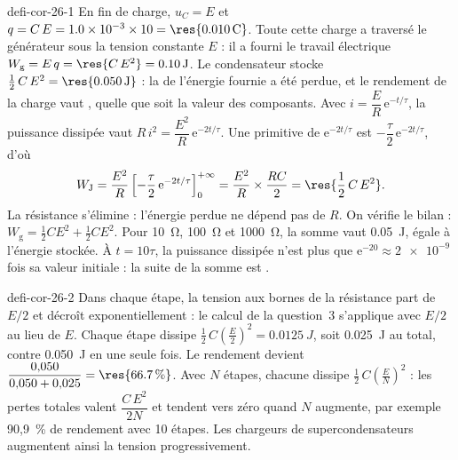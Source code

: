 \begin{blocEdition}{defi-cor-26-1}
En fin de charge, $u_C=E$ et $q=C\,E=\num{1.0e-3}\times10=\res{\qty{0,010}{C}}$. Toute cette charge a traversé le générateur sous la
tension constante $E$ : il a fourni le travail électrique $W_\mathrm{g}=E\,q=\res{C\,E^2}=\qty{0,10}{J}$.
Le condensateur stocke $\frac12\,C\,E^2=\res{\qty{0,050}{J}}$ : la  de l'énergie fournie a été perdue, et le rendement
de la charge vaut , quelle que soit la valeur des composants.
Avec $i=\dfrac{E}{R}\,\mathrm{e}^{-t/\tau}$, la puissance dissipée vaut $R\,i^2=\dfrac{E^2}{R}\,\mathrm{e}^{-2t/\tau}$. Une primitive de $\mathrm{e}^{-2t/\tau}$ est
$-\dfrac{\tau}{2}\,\mathrm{e}^{-2t/\tau}$, d'où
\[W_\mathrm{J}=\frac{E^2}{R}\left[-\frac{\tau}{2}\,\mathrm{e}^{-2t/\tau}\right]_0^{+\infty}=\frac{E^2}{R}\times\frac{RC}{2}=\res{\frac12\,C\,E^2}.\]
La résistance s'élimine : l'énergie perdue ne dépend pas de $R$. On vérifie le bilan : $W_\mathrm{g}=\frac12CE^2+\frac12CE^2$.
Pour \qty{10}{\ohm}, \qty{100}{\ohm} et \qty{1000}{\ohm}, la somme vaut \qty{0,05}{J}, égale à l'énergie stockée. À $t=10\tau$, la puissance
dissipée n'est plus que $\mathrm{e}^{-20}\approx\num{2e-9}$ fois sa valeur initiale : la suite de la somme est .
\end{blocEdition}

\begin{blocEdition}{defi-cor-26-2}
\label{figedition-defi-cor-26-2-1}
Dans chaque étape, la tension aux bornes de la résistance part de $E/2$ et décroît exponentiellement : le calcul de la
question~3 s'applique avec $E/2$ au lieu de $E$. Chaque étape dissipe $\frac12\,C\left(\frac{E}{2}\right)^2=\qty{0,0125}{J}$, soit
\qty{0,025}{J} au total, contre \qty{0,050}{J} en une seule fois. Le rendement devient $\dfrac{0{,}050}{0{,}050+0{,}025}=\res{\qty{66,7}{\percent}}$.
Avec $N$ étapes, chacune dissipe $\frac12\,C\left(\frac{E}{N}\right)^2$ : les pertes totales valent $\dfrac{C\,E^2}{2N}$ et tendent vers zéro quand
$N$ augmente, par exemple 90,9~\% de rendement avec 10 étapes. Les chargeurs de supercondensateurs augmentent ainsi la
tension progressivement.
\end{blocEdition}

